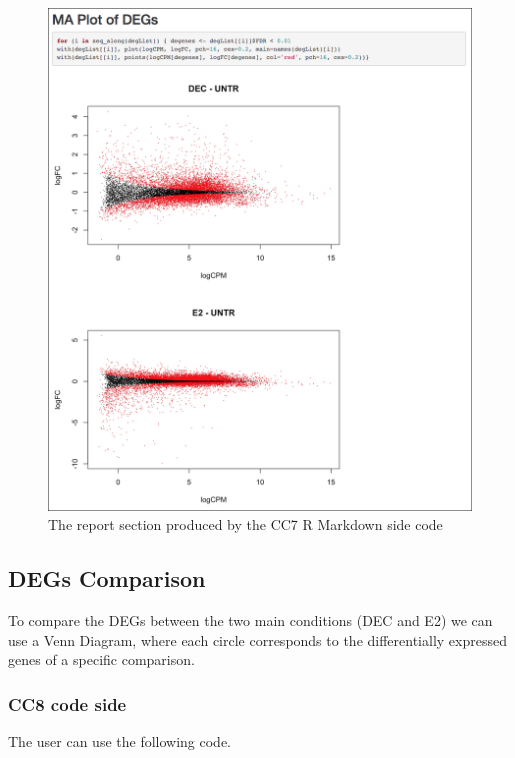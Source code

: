 \documentclass[]{article}
\newenvironment{Shaded}{\begin{snugshade}}{\end{snugshade}}
\newcommand{\CharTok}[1]{\textcolor[rgb]{0.31,0.60,0.02}{#1}}
\newcommand{\DataTypeTok}[1]{\textcolor[rgb]{0.13,0.29,0.53}{#1}}
\newcommand{\DecValTok}[1]{\textcolor[rgb]{0.00,0.00,0.81}{#1}}
\newcommand{\KeywordTok}[1]{\textcolor[rgb]{0.13,0.29,0.53}{\textbf{#1}}}
\newcommand{\NormalTok}[1]{#1}
\newcommand{\StringTok}[1]{\textcolor[rgb]{0.31,0.60,0.02}{#1}}
\begin{document}
\begin{figure}[ht]

{\centering \includegraphics[width=0.7\linewidth]{imgs/7} 

}

\caption{The report section produced by the CC7 R Markdown side code}\label{fig:unnamed-chunk-16}
\end{figure}

\hypertarget{degs-comparison}{%
\subsection{DEGs Comparison}\label{degs-comparison}}

To compare the DEGs between the two main conditions (DEC and E2) we can
use a Venn Diagram, where each circle corresponds to the differentially
expressed genes of a specific comparison.

\hypertarget{cc8-code-side}{%
\subsubsection{CC8 code side}\label{cc8-code-side}}

The user can use the following code.

\begin{Shaded}
\end{Shaded}
\end{document}
